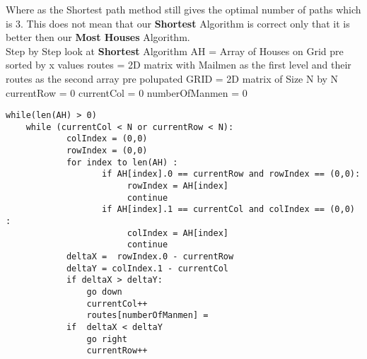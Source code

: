 \documentclass[11pt]{article}
\begin{document}
\hfill \break
\break
Where as the Shortest path method still gives the optimal number of paths which is 3. This does not mean that our  \textbf{Shortest} Algorithm is correct only that it is better then our \textbf{Most Houses} Algorithm.
\hfill \break
\break
\\
Step by Step look at \textbf{Shortest} Algorithm
\hfill \break
\break
AH = Array of Houses on Grid pre sorted by x values
\newline
routes =  2D matrix with Mailmen as the first level and their routes as the second array pre polupated 
GRID = 2D matrix of Size N by N
\newline
currentRow = 0
\newline
currentCol = 0
\newline
numberOfManmen = 0
\begin{lstlisting}
while(len(AH) > 0)
    while (currentCol < N or currentRow < N):
            colIndex = (0,0)
            rowIndex = (0,0)
            for index to len(AH) :
                   if AH[index].0 == currentRow and rowIndex == (0,0):
                        rowIndex = AH[index]
                        continue
                   if AH[index].1 == currentCol and colIndex == (0,0) :
                        colIndex = AH[index]
                        continue
            deltaX =  rowIndex.0 - currentRow
            deltaY = colIndex.1 - currentCol
            if deltaX > deltaY:
                go down
                currentCol++
                routes[numberOfManmen] = 
            if  deltaX < deltaY
                go right
                currentRow++
                
            
        
        
        
           
            
            
                
                
    
\end{lstlisting}





 


\pagebreak
\end{document}
